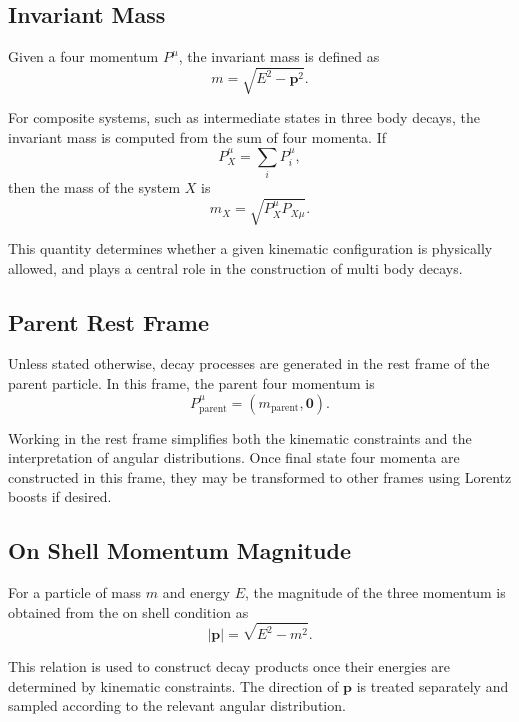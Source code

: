 \documentclass[11pt,a4paper]{article}
\newcommand{\p}{\mathbf{p}}
\begin{document}
\subsection{Invariant Mass}

Given a four momentum $P^\mu$, the invariant mass is defined as
\begin{equation}
m = \sqrt{E^2 - \p^2} .
\end{equation}

For composite systems, such as intermediate states in three body decays, the invariant
mass is computed from the sum of four momenta. If
\begin{equation}
P_X^\mu = \sum_i P_i^\mu ,
\end{equation}
then the mass of the system $X$ is
\begin{equation}
m_X = \sqrt{P_X^\mu P_{X\mu}} .
\end{equation}

This quantity determines whether a given kinematic configuration is physically allowed,
and plays a central role in the construction of multi body decays.

\subsection{Parent Rest Frame}

Unless stated otherwise, decay processes are generated in the rest frame of the parent
particle. In this frame, the parent four momentum is
\begin{equation}
P_{\text{parent}}^\mu = (m_{\text{parent}}, \mathbf{0}) .
\end{equation}

Working in the rest frame simplifies both the kinematic constraints and the interpretation
of angular distributions. Once final state four momenta are constructed in this frame,
they may be transformed to other frames using Lorentz boosts if desired.

\subsection{On Shell Momentum Magnitude}

For a particle of mass $m$ and energy $E$, the magnitude of the three momentum is obtained
from the on shell condition as
\begin{equation}
|\p| = \sqrt{E^2 - m^2} .
\end{equation}

This relation is used to construct decay products once their energies are determined by
kinematic constraints. The direction of $\p$ is treated separately and sampled according
to the relevant angular distribution.
\end{document}
